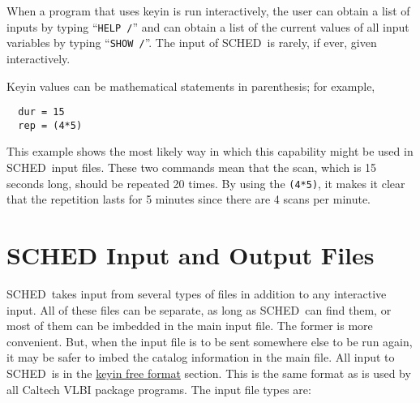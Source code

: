 \documentclass{report}
\newcommand{\schedb}{{\sc SCHED~}}
\begin{document}
When a program that uses keyin is run interactively, the user can
obtain a list of inputs by typing ``{\tt HELP /}'' and can obtain a list of
the current values of all input variables by typing ``{\tt SHOW /}''.
The input of \schedb is rarely, if ever, given interactively.

Keyin values can be mathematical statements in parenthesis; for
example,
\begin{verbatim}
  dur = 15
  rep = (4*5)
\end{verbatim}
This example shows the most likely way in which this capability might
be used in \schedb input files.  These two commands mean that
the scan, which is 15 seconds long, should be repeated 20 times.
By using the {\tt (4*5)}, it makes it clear that the repetition
lasts for 5 minutes since there are 4 scans per minute.

\section{\label{SEC:FILES} SCHED Input and Output Files}

\schedb takes input from several types of files in addition to any
interactive input.  All of these files can be separate, as long as
\schedb can find them, or most of them can be imbedded in the main
input file.  The former is more convenient.  But, when the input file
is to be sent somewhere else to be run again, it may be safer to imbed
the catalog information in the main file.  All input to \schedb is in
the
\hyperref[SEC:KEYIN]{keyin free format}
section.
This is the same format as is used by all Caltech VLBI
package programs.  The input file types are:
\end{document}
